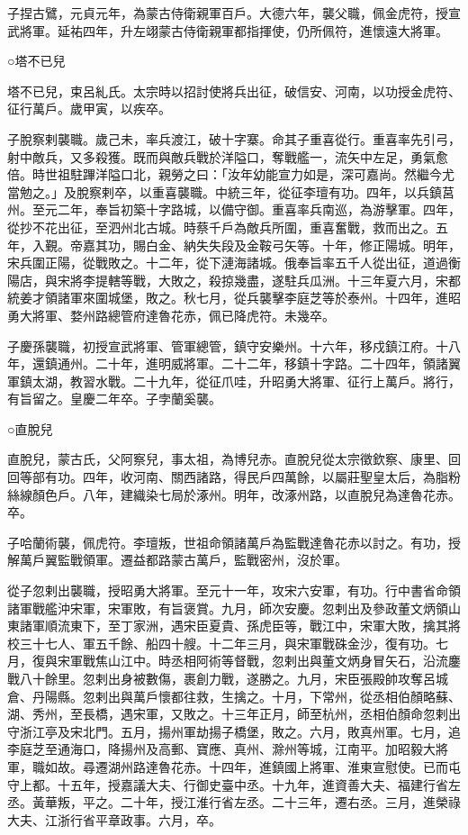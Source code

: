 \begin{pinyinscope}
 子捏古鷿，元貞元年，為蒙古侍衛親軍百戶。大德六年，襲父職，佩金虎符，授宣武將軍。延祐四年，升左翊蒙古侍衛親軍都指揮使，仍所佩符，進懷遠大將軍。



 ○塔不已兒



 塔不已兒，束呂糺氏。太宗時以招討使將兵出征，破信安、河南，以功授金虎符、征行萬戶。歲甲寅，以疾卒。



 子脫察剌襲職。歲己未，率兵渡江，破十字寨。命其子重喜從行。重喜率先引弓，射中敵兵，又多殺獲。既而與敵兵戰於洋隘口，奪戰艦一，流矢中左足，勇氣愈倍。時世祖駐蹕洋隘口北，親勞之曰：「汝年幼能宣力如是，深可嘉尚。然繼今尤當勉之。」及脫察剌卒，以重喜襲職。中統三年，從征李璮有功。四年，以兵鎮莒州。至元二年，奉旨初築十字路城，以備守御。重喜率兵南巡，為游擊軍。四年，從抄不花出征，至泗州北古城。時蔡千戶為敵兵所圍，重喜奮戰，救而出之。五年，入覲。帝嘉其功，賜白金、納失失段及金鞍弓矢等。十年，修正陽城。明年，宋兵圍正陽，從戰敗之。十二年，從下漣海諸城。俄奉旨率五千人從出征，道過衡陽店，與宋將李提轄等戰，大敗之，殺掠幾盡，遂駐兵瓜洲。十三年夏六月，宋都統姜才領諸軍來圍城堡，敗之。秋七月，從兵襲擊李庭芝等於泰州。十四年，進昭勇大將軍、婺州路總管府達魯花赤，佩已降虎符。未幾卒。



 子慶孫襲職，初授宣武將軍、管軍總管，鎮守安樂州。十六年，移戍鎮江府。十八年，還鎮通州。二十年，進明威將軍。二十二年，移鎮十字路。二十四年，領諸翼軍鎮太湖，教習水戰。二十九年，從征爪哇，升昭勇大將軍、征行上萬戶。將行，有旨留之。皇慶二年卒。子孛蘭奚襲。



 ○直脫兒



 直脫兒，蒙古氏，父阿察兒，事太祖，為博兒赤。直脫兒從太宗徵欽察、康里、回回等部有功。四年，收河南、關西諸路，得民戶四萬餘，以屬莊聖皇太后，為脂粉絲線顏色戶。八年，建織染七局於涿州。明年，改涿州路，以直脫兒為達魯花赤。卒。



 子哈蘭術襲，佩虎符。李璮叛，世祖命領諸萬戶為監戰達魯花赤以討之。有功，授解萬戶翼監戰領軍。遷益都路蒙古萬戶，監戰密州，沒於軍。



 從子忽剌出襲職，授昭勇大將軍。至元十一年，攻宋六安軍，有功。行中書省命領諸軍戰艦沖宋軍，宋軍敗，有旨褒賞。九月，師次安慶。忽剌出及參政董文炳領山東諸軍順流東下，至丁家洲，遇宋臣夏貴、孫虎臣等，戰江中，宋軍大敗，擒其將校三十七人、軍五千餘、船四十艘。十二年三月，與宋軍戰硃金沙，復有功。七月，復與宋軍戰焦山江中。時丞相阿術等督戰，忽剌出與董文炳身冒矢石，沿流鏖戰八十餘里。忽剌出身被數傷，裹創力戰，遂勝之。九月，宋臣張殿帥攻奪呂城倉、丹陽縣。忽剌出與萬戶懷都往救，生擒之。十月，下常州，從丞相伯顏略蘇、湖、秀州，至長橋，遇宋軍，又敗之。十三年正月，師至杭州，丞相伯顏命忽剌出守浙江亭及宋北門。五月，揚州軍劫揚子橋堡，敗之。六月，敗真州軍。七月，追李庭芝至通海口，降揚州及高郵、寶應、真州、滁州等城，江南平。加昭毅大將軍，職如故。尋遷湖州路達魯花赤。十四年，進鎮國上將軍、淮東宣慰使。已而屯守上都。十五年，授嘉議大夫、行御史臺中丞。十九年，進資善大夫、福建行省左丞。黃華叛，平之。二十年，授江淮行省左丞。二十三年，遷右丞。三月，進榮祿大夫、江浙行省平章政事。六月，卒。




\end{pinyinscope}
